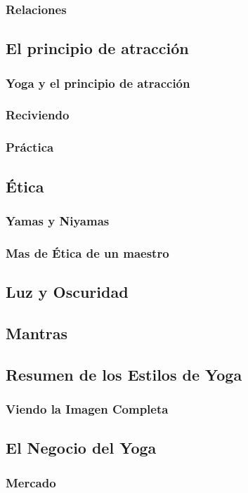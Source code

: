 \documentclass[a4paper]{book}
\begin{document}
\subsubsection{Relaciones}
\subsection{El principio de atracción}
\subsubsection{Yoga y el principio de atracción}
\subsubsection{Reciviendo}
\subsubsection{Práctica}
\subsection{Ética}
\subsubsection{Yamas y Niyamas}
\subsubsection{Mas de Ética de un maestro}
\subsection{Luz y Oscuridad}
\subsection{Mantras}
\subsection{Resumen de los Estilos de Yoga}
\subsubsection{Viendo la Imagen Completa}
\subsection{El Negocio del Yoga}
\subsubsection{Mercado}
\end{document}
